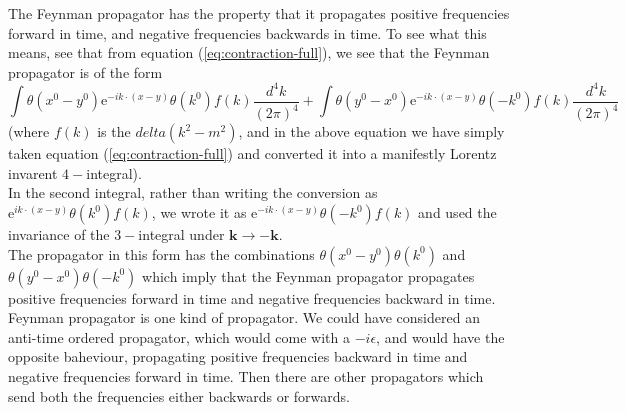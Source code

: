 \documentclass[11pt, notitlepage]{report}
\newcommand{\e}{\mathrm{e}}
\numberwithin{equation}{section}
\begin{document}
    The Feynman propagator has the property that it propagates positive frequencies forward in time, and negative frequencies backwards in time. To see what this means, see that from equation (\ref{eq:contraction-full}), we see that the Feynman propagator is of the form 
    \begin{equation*}
        \int \theta(x^0 - y^0)  \e^{-ik\cdot (x-y)} \theta(k^0) f(k) \frac{d^4k}{(2\pi)^4}  + \int \theta(y^0 - x^0)  \e^{-ik\cdot (x-y)} \theta(-k^0) f(k) \frac{d^4k}{(2\pi)^4}
    \end{equation*}
    (where \(f(k)\) is the \(delta(k^2 - m^2)\), and in the above equation we have simply taken equation (\ref{eq:contraction-full}) and converted it into a manifestly Lorentz invarent \(4-\)integral).\\
    In the second integral, rather than writing the conversion as \(\e^{ik\cdot(x-y)} \theta(k^0) f(k)\), we wrote it as \(\e^{-ik\cdot(x-y)}\theta(-k^0)f(k)\) and used the invariance of the \(3-\)integral under \(\textbf{k}\to -\textbf{k}\). \\
    The propagator in this form has the combinations \(\theta(x^0 - y^0)\theta(k^0)\) and \(\theta(y^0 - x^0)\theta(-k^0)\) which imply that the Feynman propagator propagates positive frequencies forward in time and negative frequencies backward in time.\\

    Feynman propagator is one kind of propagator. We could have considered an anti-time ordered propagator, which would come with a \(-i\epsilon\), and would have the opposite baheviour, propagating positive frequencies backward in time and negative frequencies forward in time. Then there are other propagators which send both the frequencies either backwards or forwards.
\end{document}

